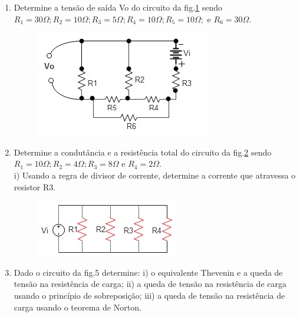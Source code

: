 \documentclass[12pt,a4paper,titlepage]{report}
\begin{document}
\begin{enumerate}
\it{Convers\~ao: $\bigtriangleup \longrightarrow Y$}\\
\begin{equation}
R_c=\frac{R_2 \times R_3}{R_1+R_2+R_3}
\end{equation}
 Repare que cada resist\^encia ser\'a o quociente entre o produto das duas resist\^encias adjacentes dividido pela soma de todas as que formam a rede triangular. Neste caso, para $R_c$, as duas resist\^encias adjacentes s\~ao $R_2$ e $R_3$.\\
\color{red}Assim: $R_t=5.16\Omega$ \color{black}
\rm
\item Determine a tensão de saída Vo do circuito da fig.\ref{fig3} sendo $R_1=30\Omega; R_2=10\Omega;R_3=5\Omega;R_4=10\Omega;R_5=10\Omega; $ e $R_6=30\Omega$.
 \begin{figure}[htb]
\centering
\includegraphics[scale=0.6]{fig3}
\caption{}
\label{fig3}
\end{figure}

\item Determine a condutância e a resistência total do circuito da fig.\ref{fig4} sendo $R_1=10\Omega; R_2=4\Omega;R_3=8\Omega$ e $R_4=2\Omega$.\\
i)	Usando a regra de divisor de corrente, determine a corrente que atravessa o resistor R3.
 \begin{figure}[htb]
\centering
\includegraphics[scale=0.8]{fig4}
\caption{}
\label{fig4}
\end{figure}

\item Dado o circuito da fig.5  determine: i) o equivalente Thevenin e a queda de tensão na resistência de carga; ii) a queda de tensão na resistência de carga usando o princípio de sobreposição; iii) a queda de tensão na resistência de carga usando o teorema de Norton.

\end{enumerate}
\end{document}
